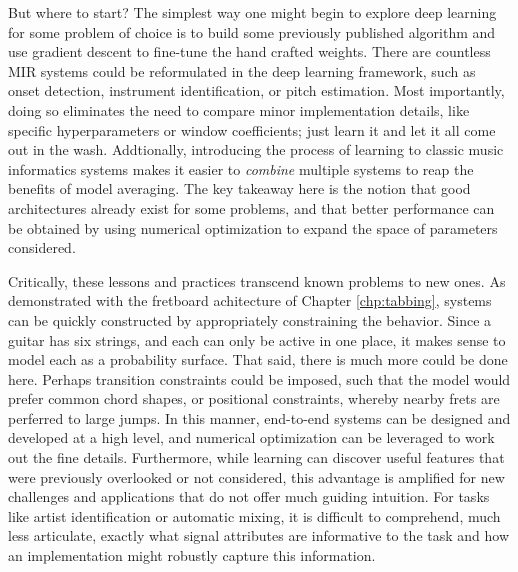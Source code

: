 But where to start?
The simplest way one might begin to explore deep learning for some problem of choice is to build some previously published algorithm and use gradient descent to fine-tune the hand crafted weights.
There are countless MIR systems could be reformulated in the deep learning framework, such as onset detection, instrument identification, or pitch estimation.
Most importantly, doing so eliminates the need to compare minor implementation details, like specific hyperparameters or window coefficients;
just learn it and let it all come out in the wash.
Addtionally, introducing the process of learning to classic music informatics systems makes it easier to \emph{combine} multiple systems to reap the benefits of model averaging.
The key takeaway here is the notion that good architectures already exist for some problems, and that better performance can be obtained by using numerical optimization to expand the space of parameters considered.

Critically, these lessons and practices transcend known problems to new ones.
As demonstrated with the fretboard achitecture of Chapter \ref{chp:tabbing}, systems can be quickly constructed by appropriately constraining the behavior.
Since a guitar has six strings, and each can only be active in one place, it makes sense to model each as a probability surface.
That said, there is much more could be done here.
Perhaps transition constraints could be imposed, such that the model would prefer common chord shapes, or positional constraints, whereby nearby frets are perferred to large jumps.
In this manner, end-to-end systems can be designed and developed at a high level, and numerical optimization can be leveraged to work out the fine details.
Furthermore, while learning can discover useful features that were previously overlooked or not considered, this advantage is amplified for new challenges and applications that do not offer much guiding intuition.
For tasks like artist identification or automatic mixing, it is difficult to comprehend, much less articulate, exactly what signal attributes are informative to the task and how an implementation might robustly capture this information.

